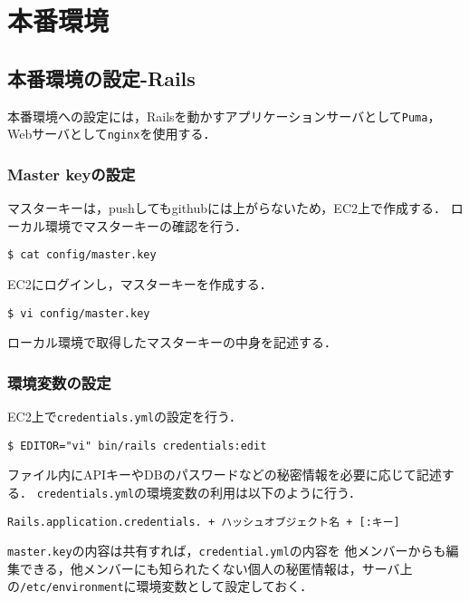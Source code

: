 \chapter{本番環境}
\section{本番環境の設定-Rails}
本番環境への設定には，Railsを動かすアプリケーションサーバとして\texttt{Puma}，
Webサーバとして\texttt{nginx}を使用する．
\subsection{Master keyの設定}
マスターキーは，pushしてもgithubには上がらないため，EC2上で作成する．
ローカル環境でマスターキーの確認を行う．
\begin{screen}
    \texttt{\$ cat config/master.key}
\end{screen}
EC2にログインし，マスターキーを作成する．
\begin{screen}
    \texttt{\$ vi config/master.key}
\end{screen}
ローカル環境で取得したマスターキーの中身を記述する．

\subsection{環境変数の設定}
EC2上で\texttt{credentials.yml}の設定を行う．
\begin{screen}
    \texttt{\$ EDITOR="vi" bin/rails credentials:edit}
\end{screen}
ファイル内にAPIキーやDBのパスワードなどの秘密情報を必要に応じて記述する．
\texttt{credentials.yml}の環境変数の利用は以下のように行う．
\begin{screen}
    \texttt{Rails.application.credentials. + ハッシュオブジェクト名 + [:キー]}
\end{screen}
\texttt{master.key}の内容は共有すれば，\texttt{credential.yml}の内容を
他メンバーからも編集できる，他メンバーにも知られたくない個人の秘匿情報は，サーバ上
の\texttt{/etc/environment}に環境変数として設定しておく．

